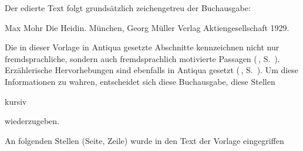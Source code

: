 

Der edierte Text folgt grundsätzlich zeichengetreu der Buchausgabe:

Max Mohr\dopp{} Die Heidin. München, Georg Müller Verlag Aktiengesellschaft
1929.

Die in dieser Vorlage in Antiqua gesetzte Abschnitte kennzeichnen nicht nur
fremdsprachliche, sondern auch fremdsprachlich motivierte Passagen
(\,, S.~\pageref{lS47-1}). Erzählerische
Hervorhebungen sind ebenfalls in Antiqua gesetzt (\,,
S.~\pageref{lS48-1}).
Um diese Informationen zu wahren, entscheidet sich diese Buchausgabe,
diese Stellen \begin{it}kursiv\end{it} wiederzugeben.

An folgenden Stellen (Seite, Zeile) wurde in den Text der
Vorlage eingegriffen\dopp{}

\theendnotes
